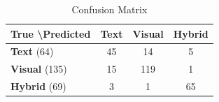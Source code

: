\begin{table}[t]
\centering
\caption{Confusion Matrix}
\label{tab:confusion_matrix}
\begin{tabular}{lccc}
\toprule
\textbf{True \textbackslash Predicted} & \textbf{Text} & \textbf{Visual} & \textbf{Hybrid} \\
\midrule
\textbf{Text} (64) & 45 & 14 & 5 \\
\textbf{Visual} (135) & 15 & 119 & 1 \\
\textbf{Hybrid} (69) & 3 & 1 & 65 \\
\bottomrule
\end{tabular}
\end{table}